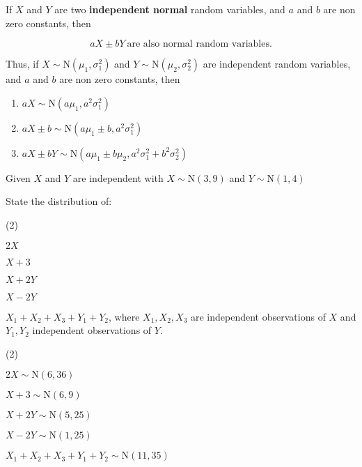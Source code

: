 \documentclass[11pt,a4paper]{book}
\begin{document}
\medskip


If $X$ and $Y$ are two \textbf{independent normal} random variables,
and $a$ and $b$ are non zero constants, then

\[
aX\pm bY\:\text{are also normal random variables.}
\]

Thus, if $X\sim\text{N}\left(\mu_{1},\sigma_{1}^{2}\right)$ and $Y\sim\text{N}\left(\mu_{2},\sigma_{2}^{2}\right)$
are independent random variables, and $a$ and $b$ are non zero constants,
then

\begin{enumerate}[label=(\alph*)]

\item $aX\sim\text{N}\left(a\mu_{1},a^{2}\sigma_{1}^{2}\right)$

\item $aX\pm b\sim\text{N}\left(a\mu_{1}\pm b,a^{2}\sigma_{1}^{2}\right)$

\item $aX\pm bY\sim\text{N}\left(a\mu_{1}\pm b\mu_{2},a^{2}\sigma_{1}^{2}+b^{2}\sigma_{2}^{2}\right)$

\end{enumerate}

\begin{example}

Given $X$ and $Y$ are independent with $X\sim\text{N}\left(3,9\right)$
and $Y\sim\text{N}\left(1,4\right)$

State the distribution of:

\begin{tasks}[label=(\alph*),label-width=3.5ex](2) 

\task  $2X$

\task  $X+3$

\task  $X+2Y$

\task  $X-2Y$

\task  $X_{1}+X_{2}+X_{3}+Y_{1}+Y_{2}$, where $X_{1},X_{2},X_{3}$
are independent observations of $X$ and $Y_{1},Y_{2}$ independent
observations of $Y$.

\end{tasks}

\Solution

\begin{tasks}[label=(\alph*),label-width=3.5ex](2) 

\task  $2X\sim\text{N}\left(6,36\right)$

\task  $X+3\sim\text{N}\left(6,9\right)$

\task  $X+2Y\sim\text{N}\left(5,25\right)$

\task  $X-2Y\sim\text{N}\left(1,25\right)$

\task  $X_{1}+X_{2}+X_{3}+Y_{1}+Y_{2}\sim\text{N}\left(11,35\right)$

\end{tasks}

\end{example}
\end{document}

